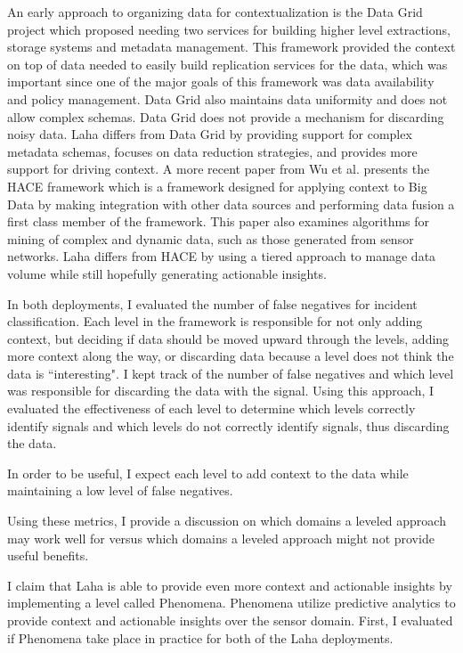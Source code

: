 An early approach to organizing data for contextualization is the Data Grid project\cite{chervenak2000data} which proposed needing two services for building higher level extractions, storage systems and metadata management. This framework provided the context on top of data needed to easily build replication services for the data, which was important since one of the major goals of this framework was data availability and policy management. Data Grid also maintains data uniformity and does not allow complex schemas. Data Grid does not provide a mechanism for discarding noisy data. Laha differs from Data Grid by providing support for complex metadata schemas, focuses on data reduction strategies, and provides more support for driving context. A more recent paper from Wu et al.\cite{wu2014data} presents the HACE framework which is a framework designed for applying context to Big Data by making integration with other data sources and performing data fusion a first class member of the framework. This paper also examines algorithms for mining of complex and dynamic data, such as those generated from sensor networks. Laha differs from HACE by using a tiered approach to manage data volume while still hopefully generating actionable insights.

In both deployments, I evaluated the number of false negatives for incident classification. Each level in the framework is responsible for not only adding context, but deciding if data should be moved upward through the levels, adding more context along the way, or discarding data because a level does not think the data is ``interesting". I kept track of the number of false negatives and which level was responsible for discarding the data with the signal. Using this approach, I evaluated the effectiveness of each level to determine which levels correctly identify signals and which levels do not correctly identify signals, thus discarding the data.

In order to be useful, I expect each level to add context to the data while maintaining a low level of false negatives.

Using these metrics, I provide a discussion on which domains a leveled approach may work well for versus which domains a leveled approach might not provide useful benefits.

I claim that Laha is able to provide even more context and actionable insights by implementing a level called Phenomena. Phenomena utilize predictive analytics to provide context and actionable insights over the sensor domain. First, I evaluated if Phenomena take place in practice for both of the Laha deployments.

